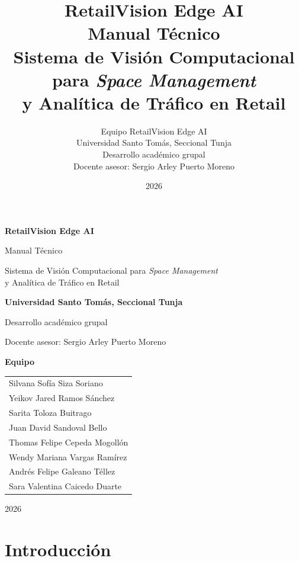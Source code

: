 \documentclass[11pt,a4paper]{report}
\title{\textbf{\Huge RetailVision Edge AI}\\[6pt]
  \Large Manual Técnico\\[4pt]
  \large Sistema de Visión Computacional para \textit{Space Management}\\
  y Analítica de Tráfico en Retail}
\author{Equipo RetailVision Edge AI\\
  Universidad Santo Tomás, Seccional Tunja\\
  Desarrollo académico grupal\\
  Docente asesor: Sergio Arley Puerto Moreno}
\date{2026}
\begin{document}
\begin{titlepage}
\centering
\vspace*{1.5cm}
{\Huge\bfseries\color{rvAccent} RetailVision Edge AI\par}
\vspace{0.4cm}
{\Large\color{rvInk} Manual Técnico\par}
\vspace{0.3cm}
{\large\color{rvMuted} Sistema de Visión Computacional para \textit{Space Management}\\
y Analítica de Tráfico en Retail\par}
\vspace{2.2cm}

{\large\color{rvInk}\textbf{Universidad Santo Tomás, Seccional Tunja}\par}
\vspace{0.2cm}
{\normalsize\color{rvMuted} Desarrollo académico grupal\par}
\vspace{0.15cm}
{\normalsize\color{rvMuted} Docente asesor: Sergio Arley Puerto Moreno\par}

\vspace{2.2cm}
{\normalsize\color{rvInk}\textbf{Equipo}\par}
\vspace{0.3cm}
\begin{tabular}{l}
Silvana Sofía Siza Soriano \\
Yeikov Jared Ramos Sánchez \\
Sarita Toloza Buitrago \\
Juan David Sandoval Bello \\
Thomas Felipe Cepeda Mogollón \\
Wendy Mariana Vargas Ramírez \\
Andrés Felipe Galeano Téllez \\
Sara Valentina Caicedo Duarte \\
\end{tabular}

\vfill
{\large\color{rvMuted} 2026\par}
\end{titlepage}

\tableofcontents
\clearpage

\chapter{Introducción}
\end{document}
